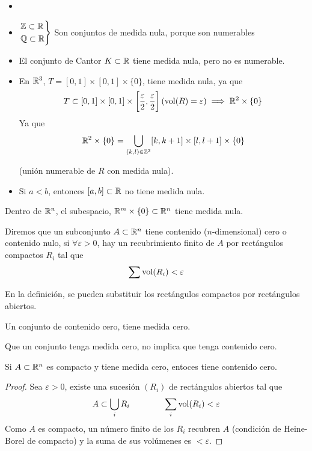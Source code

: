 \begin{example*}
	\begin{itemize}
		\item[]
		\item $\begin{rcases} \mathbb{Z} \subset \mathbb{R} \\ \mathbb{Q} \subset \mathbb{R}\end{rcases}$
			Son conjuntos de medida nula, porque son numerables
		\item El conjunto de Cantor $K \subset \mathbb{R}$ tiene medida nula, pero
			no es numerable.
		\item En $\mathbb{R}^3$, $T = [0,1]\times[0,1]\times\{0\}$, tiene medida
			nula, ya que
			\[
				T \subset [0,1] \times [0,1] \times
				\left[\frac{\varepsilon}{2},\frac{\varepsilon}{2}
				\right] (\operatorname{vol}(R)=\varepsilon) \implies
				\mathbb{R}^2\times\{0\}
			\]
			Ya que
			\[
				\mathbb{R}^2 \times \{0\} = \bigcup_{(k,l) \in \mathbb{Z}^2}
				[k,k+1] \times [l,l+1] \times \{0\}
			\]
	
			(unión numerable de $R$ con medida nula).
		\item Si $a < b$, entonces $[a,b] \subset \mathbb{R}$ no tiene medida nula.
	\end{itemize}
\end{example*}
\begin{col*}
	Dentro de $\mathbb{R}^n$, el subespacio, $\mathbb{R}^m \times \{0\} \subset \mathbb{R}^n$
	tiene medida nula.
\end{col*}

\begin{defi}
	Diremos que un subconjunto $A \subset \mathbb{R}^n$ tiene contenido
	($n$-dimensional) cero o contenido nulo, si $\forall \varepsilon > 0$, hay un
	recubrimiento finito de $A$ por rectángulos compactos $R_i$ tal que
	\[
		\sum \operatorname{vol}(R_i) < \varepsilon
	\]
\end{defi}
\begin{obs*}
	En la definición, se pueden substituir los rectángulos compactos por
	rectángulos abiertos.
\end{obs*}
\begin{obs*}
	Un conjunto de contenido cero, tiene medida cero.
\end{obs*}
\begin{obs*}
	Que un conjunto tenga medida cero, no implica que tenga contenido cero.
\end{obs*}

\begin{prop}
	Si $A \subset \mathbb{R}^n$ es compacto y tiene medida cero, entoces tiene contenido
	cero.
\end{prop}
\begin{proof}
	Sea $\varepsilon > 0$, existe una sucesión $(R_i)$ de rectángulos abiertos tal
	que
	\[
		A \subset \bigcup_i R_i \qquad \qquad \sum_i \operatorname{vol}(R_i) < \varepsilon
	\]
	Como $A$ es compacto, un número finito de los $R_i$ recubren $A$ (condición
	de Heine-Borel de compacto) y la suma de sus volúmenes es $< \varepsilon$.
\end{proof}

